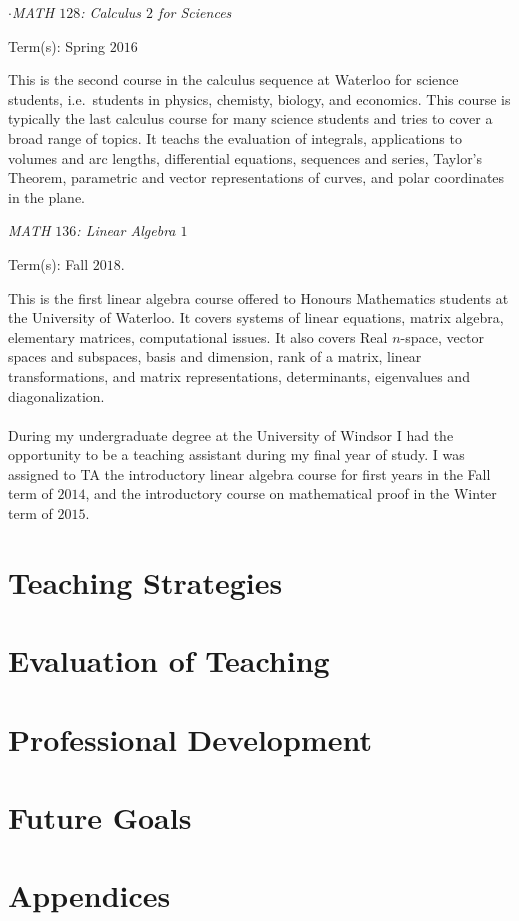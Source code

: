 \documentclass{article}
\begin{document}
\noindent$\cdot$\emph{MATH $128$: Calculus $2$ for Sciences}

Term(s): Spring $2016$

This is the second course in the calculus sequence at Waterloo for science students, i.e.\ students in physics, chemisty, biology, and economics. This course is typically the last calculus course for many science students and tries to cover a broad range of topics. It teachs the evaluation of integrals, applications to volumes and arc lengths, differential equations, sequences and series, Taylor's Theorem, parametric and vector representations of curves, and polar coordinates in the plane.

\noindent\emph{MATH $136$: Linear Algebra $1$}

Term(s): Fall $2018$.

This is the first linear algebra course offered to Honours Mathematics students at the University of Waterloo. It covers systems of linear equations, matrix algebra, elementary matrices, computational issues. It also covers Real $n$-space, vector spaces and subspaces, basis and dimension, rank of a matrix, linear transformations, and matrix representations, determinants, eigenvalues and diagonalization.

\paragraph{}During my undergraduate degree at the University of Windsor I had the opportunity to be a teaching assistant during my final year of study. I was assigned to TA the introductory linear algebra course for first years in the Fall term of $2014$, and the introductory course on mathematical proof in the Winter term of $2015$.

\section{Teaching Strategies}

\section{Evaluation of Teaching}

\section{Professional Development}

\section{Future Goals}


\appendix
\section*{Appendices}
\section{}
\end{document}

